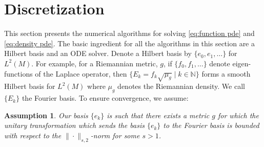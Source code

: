 \documentclass[final,leqno]{siamltex1213}
\newcommand{\ram}[1]{{\normalsize{\textbf{({\color{red}RAMBO:\ }#1)}}}}
\newtheorem{ass}[theorem]{Assumption}
\begin{document}
%
%

\section{Discretization} \label{sec:discretization}
This section presents the numerical algorithms for solving \eqref{eq:function pde} and \eqref{eq:density pde}.
The basic ingredient for all the algorithms in this section are a Hilbert basis and an ODE solver.
Denote a Hilbert basis by $\{ e_{0}, e_{1},\dots \}$ for $L^{2}(M)$.
For example, for a Riemannian metric, $g$, if $\{ f_{0}, f_{1},\dots \}$ denote eigen-functions of the Laplace operator, then $\{ E_{k} = f_{k} \sqrt{\mu_{g}} \mid k \in \mathbb{N} \}$ forms a smooth Hilbert basis for $L^{2}(M)$ where $\mu_{g}$ denotes the Riemannian density.  We call $\{ E_{k} \}$ the Fourier basis.
To ensure convergence, we assume:
\begin{ass} \label{ass:basis}
	Our basis $\{ e_{k} \}$ is such that there exists a metric $g$ for which the unitary transformation which sends the basis $\{ e_{k} \}$ to the Fourier basis is bounded with respect to the $\| \cdot \|_{s,2}$-norm for some $s > 1$.
\end{ass}

\end{document}
